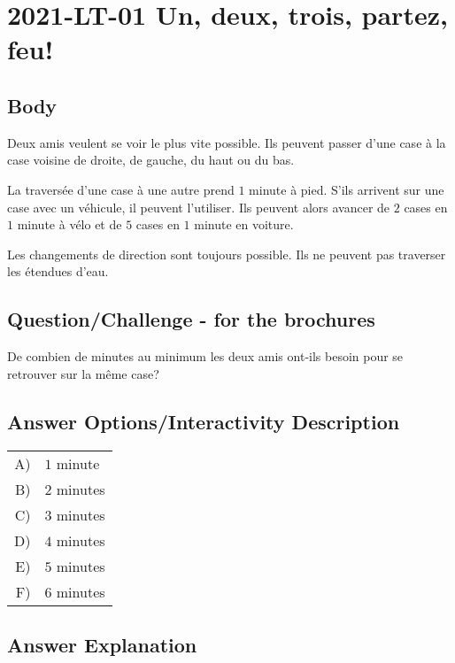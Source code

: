 \documentclass[a4paper,11pt]{report}
\newcommand{\taskGraphicsFolder}{..}
\begin{document}
\section*{\centering{} 2021-LT-01 Un, deux, trois, partez, feu!}


\subsection*{Body}

Deux amis veulent se voir le plus vite possible. Ils peuvent passer d’une case à la case voisine de droite, de gauche, du haut ou du bas.

La traversée d’une case à une autre prend $1$ minute à pied. S’ils arrivent sur une case avec un véhicule, il peuvent l’utiliser. Ils peuvent alors avancer de $2$ cases en $1$ minute à vélo et de $5$ cases en $1$ minute en voiture.

Les changements de direction sont toujours possible. Ils ne peuvent pas traverser les étendues d’eau.

{\centering%
\par}

{\em


\subsection*{Question/Challenge - for the brochures}

De combien de minutes au minimum les deux amis ont-ils besoin pour se retrouver sur la même case?

}

\begingroup
\renewcommand{\arraystretch}{1.5}
\subsection*{Answer Options/Interactivity Description}

\begin{tabular}{ @{} r l @{} }
  A) & $1$ minute \\ 
  B) & $2$ minutes \\ 
  C) & $3$ minutes \\ 
  D) & $4$ minutes \\ 
  E) & $5$ minutes \\ 
  F) & $6$ minutes
\end{tabular}

\endgroup

\subsection*{Answer Explanation}
\end{document}
